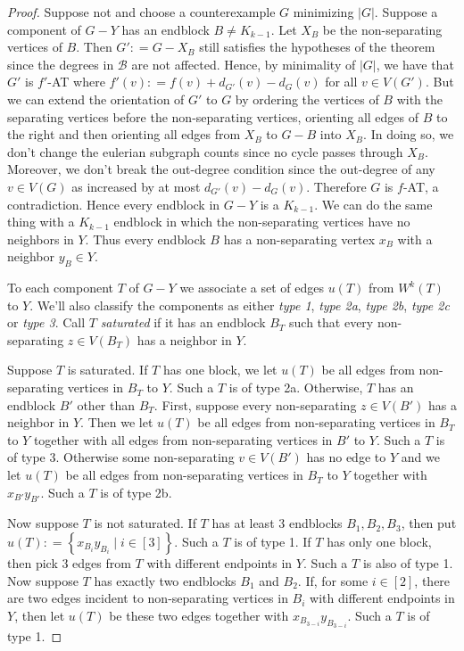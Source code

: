 \documentclass[12pt]{article}
\theoremstyle{plain}
\theoremstyle{definition}
\theoremstyle{remark}
\newcommand{\fancy}[1]{\mathcal{#1}}
\newcommand{\B}{\fancy{B}}
\newcommand{\setbs}[2]{\left\{ #1 \mid #2 \right\}}
\newcommand{\card}[1]{\left|#1\right|}
\newcommand{\irange}[1]{\left[#1\right]}
\newcommand{\DefinedAs}{\mathrel{\mathop:}=}
\begin{document}
\begin{proof}
Suppose not and choose a counterexample $G$ minimizing $\card{G}$.  Suppose a component of $G-Y$ has an endblock $B \neq K_{k-1}$.  Let $X_B$ be the non-separating vertices of $B$.  Then $G' \DefinedAs G-X_B$ still satisfies the hypotheses of the theorem since the degrees in $\B$ are not affected.  Hence, by minimality of $\card{G}$, we have that $G'$ is $f'$-AT where $f'(v) \DefinedAs f(v) + d_{G'}(v) - d_G(v)$ for all $v \in V(G')$.  But we can extend the orientation of $G'$ to $G$ by ordering the vertices of $B$ with the separating vertices before the non-separating vertices, orienting all edges of $B$ to the right and then orienting all edges from $X_B$ to $G-B$ into $X_B$. In doing so, we don't change the eulerian subgraph counts since no cycle passes through $X_B$. Moreover, we don't break the out-degree condition since the out-degree of any $v \in V(G)$ as increased by at most $d_{G'}(v) - d_G(v)$. Therefore $G$ is $f$-AT, a contradiction. Hence every endblock in $G-Y$ is a $K_{k-1}$.  We can do the same thing with a $K_{k-1}$ endblock in which the non-separating vertices have no neighbors in $Y$. Thus every endblock $B$ has a non-separating vertex $x_B$ with a neighbor $y_B \in Y$.

To each component $T$ of $G-Y$ we associate a set of edges $u(T)$ from $W^k(T)$ to $Y$. We'll also classify the components as either \emph{type 1}, \emph{type 2a}, \emph{type 2b}, \emph{type 2c} or \emph{type 3}. Call $T$ \emph{saturated} if it has an endblock $B_T$ such that every non-separating $z \in V(B_T)$ has a neighbor in $Y$.  

Suppose $T$ is saturated.  If $T$ has one block, we let $u(T)$ be all edges from non-separating vertices in $B_T$ to $Y$.  Such a $T$ is of type 2a.  Otherwise, $T$ has an endblock $B'$ other than $B_T$.  First, suppose  every non-separating $z \in V(B')$ has a neighbor in $Y$.  Then we let $u(T)$ be all edges from non-separating vertices in $B_T$ to $Y$ together with all edges from non-separating vertices in $B'$ to $Y$.  Such a $T$ is of type 3.  Otherwise some non-separating $v \in V(B')$ has no edge to $Y$ and we let $u(T)$ be all edges from non-separating vertices in $B_T$ to $Y$ together with $x_{B'}y_{B'}$.  Such a $T$ is of type 2b.

Now suppose $T$ is not saturated.  If $T$ has at least $3$ endblocks $B_1, B_2, B_3$, then put $u(T) \DefinedAs \setbs{x_{B_i}y_{B_i}}{i \in \irange{3}}$.  Such a $T$ is of type 1.  If $T$ has only one block, then pick $3$ edges from $T$ with different endpoints in $Y$.  Such a $T$ is also of type 1.  Now suppose $T$ has exactly two endblocks $B_1$ and $B_2$.  If, for some $i \in \irange{2}$, there are two edges incident to non-separating vertices in $B_i$ with different endpoints in $Y$, then let $u(T)$ be these two edges together with $x_{B_{3-i}}y_{B_{3-i}}$.  Such a $T$ is of type 1.


\end{proof}
\end{document}
